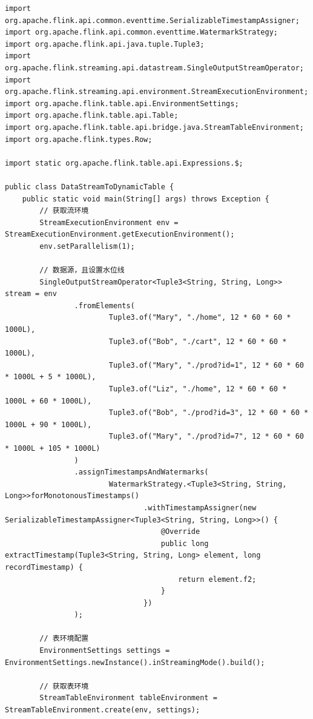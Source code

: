 \documentclass[cn,11pt,chinese]{elegantbook}
\begin{document}
\begin{verbatim}
import org.apache.flink.api.common.eventtime.SerializableTimestampAssigner;
import org.apache.flink.api.common.eventtime.WatermarkStrategy;
import org.apache.flink.api.java.tuple.Tuple3;
import org.apache.flink.streaming.api.datastream.SingleOutputStreamOperator;
import org.apache.flink.streaming.api.environment.StreamExecutionEnvironment;
import org.apache.flink.table.api.EnvironmentSettings;
import org.apache.flink.table.api.Table;
import org.apache.flink.table.api.bridge.java.StreamTableEnvironment;
import org.apache.flink.types.Row;

import static org.apache.flink.table.api.Expressions.$;

public class DataStreamToDynamicTable {
    public static void main(String[] args) throws Exception {
        // 获取流环境
        StreamExecutionEnvironment env = StreamExecutionEnvironment.getExecutionEnvironment();
        env.setParallelism(1);

        // 数据源，且设置水位线
        SingleOutputStreamOperator<Tuple3<String, String, Long>> stream = env
                .fromElements(
                        Tuple3.of("Mary", "./home", 12 * 60 * 60 * 1000L),
                        Tuple3.of("Bob", "./cart", 12 * 60 * 60 * 1000L),
                        Tuple3.of("Mary", "./prod?id=1", 12 * 60 * 60 * 1000L + 5 * 1000L),
                        Tuple3.of("Liz", "./home", 12 * 60 * 60 * 1000L + 60 * 1000L),
                        Tuple3.of("Bob", "./prod?id=3", 12 * 60 * 60 * 1000L + 90 * 1000L),
                        Tuple3.of("Mary", "./prod?id=7", 12 * 60 * 60 * 1000L + 105 * 1000L)
                )
                .assignTimestampsAndWatermarks(
                        WatermarkStrategy.<Tuple3<String, String, Long>>forMonotonousTimestamps()
                                .withTimestampAssigner(new SerializableTimestampAssigner<Tuple3<String, String, Long>>() {
                                    @Override
                                    public long extractTimestamp(Tuple3<String, String, Long> element, long recordTimestamp) {
                                        return element.f2;
                                    }
                                })
                );

        // 表环境配置
        EnvironmentSettings settings = EnvironmentSettings.newInstance().inStreamingMode().build();

        // 获取表环境
        StreamTableEnvironment tableEnvironment = StreamTableEnvironment.create(env, settings);


\end{verbatim}
\end{document}
